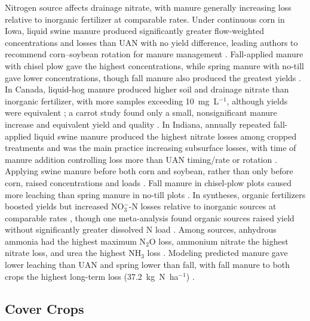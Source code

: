 Nitrogen source affects drainage nitrate, with manure generally increasing loss relative to inorganic fertilizer at comparable rates. Under continuous corn in Iowa, liquid swine manure produced significantly greater flow-weighted concentrations and losses than UAN with no yield difference, leading authors to recommend corn--soybean rotation for manure management \parencite{Bakhsh2005}. Fall-applied manure with chisel plow gave the highest concentrations, while spring manure with no-till gave lower concentrations, though fall manure also produced the greatest yields \parencite{Bakhsh2007}. In Canada, liquid-hog manure produced higher soil and drainage nitrate than inorganic fertilizer, with more samples exceeding 10~mg~L$^{-1}$, although yields were equivalent \parencite{Elmi2005}; a carrot study found only a small, nonsignificant manure increase and equivalent yield and quality \parencite{Gordon2005}. In Indiana, annually repeated fall-applied liquid swine manure produced the highest nitrate losses among cropped treatments and was the main practice increasing subsurface losses, with time of manure addition controlling loss more than UAN timing/rate or rotation \parencite{HernandezRamirez2011}. Applying swine manure before both corn and soybean, rather than only before corn, raised concentrations and loads \parencite{Dougherty2020}. Fall manure in chisel-plow plots caused more leaching than spring manure in no-till plots \parencite{Rekha2011}. In syntheses, organic fertilizers boosted yields but increased NO$_3^-$-N losses relative to inorganic sources at comparable rates \parencite{Liu2021}, though one meta-analysis found organic sources raised yield without significantly greater dissolved N load \parencite{Christianson2015b}. Among sources, anhydrous ammonia had the highest maximum N$_2$O loss, ammonium nitrate the highest nitrate loss, and urea the highest NH$_3$ loss \parencite{Chatterjee2020b}. Modeling predicted manure gave lower leaching than UAN and spring lower than fall, with fall manure to both crops the highest long-term loss (37.2~kg~N~ha$^{-1}$) \parencite{Malone2007,Malone2007b}.

\subsection{Cover Crops}

